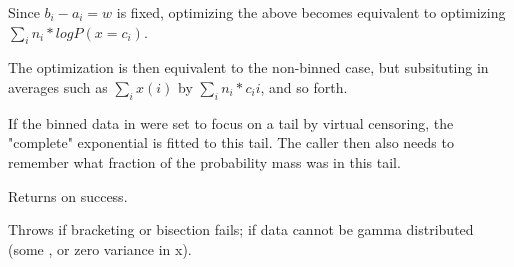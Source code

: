 \begin{sreapi}
Since $b_i-a_i = w$ is fixed, optimizing the above
becomes equivalent to optimizing $\sum_i n_i * log P(x=c_i)$.

The optimization is then equivalent to the non-binned case,
but subsituting in averages such as $\sum_i x(i)$ by
$\sum_i n_i*c_i i$, and so forth.

If the binned data in  were set to focus on 
a tail by virtual censoring, the "complete" exponential is 
fitted to this tail. The caller then also needs to
remember what fraction of the probability mass was in this
tail.

Returns  on success.

Throws  if bracketing or bisection fails;
 if data cannot be gamma distributed (some ,
or zero variance in x).




\end{sreapi}

